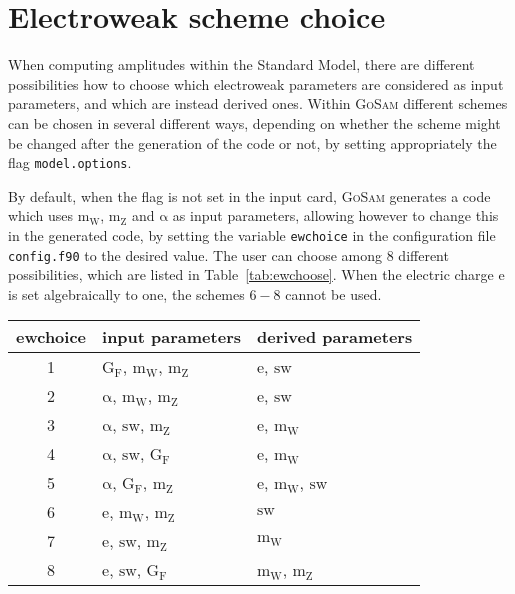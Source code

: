 \documentclass[11pt,a4paper]{refrep}
\newcommand{\gosam}{\textsc{GoSam}\xspace}
\newcommand{\mrm}[1]{\mathrm{#1}}
\begin{document}
\section{Electroweak scheme choice}
\label{sec:ewchoose}
When computing amplitudes within the Standard Model, there are different
possibilities how to choose which electroweak parameters are
considered as input parameters, and which are instead derived
ones. Within \gosam{} different schemes can be chosen in several
different ways, depending on whether the scheme might be changed after
the generation of the code or not, by setting appropriately the flag
{\tt model.options}.

By default, when the flag is not set in the input card, \gosam{}
generates a code which uses $\mrm{m_W}$, $\mrm{m_Z}$ and
$\mrm{\alpha}$ as input parameters, allowing however to change this in
the generated code, by setting the variable {\tt ewchoice} in the
configuration file {\tt config.f90} to the desired value. The user can
choose among 8 different possibilities, which are listed in
Table~\ref{tab:ewchoose}.  When the electric charge $\mrm{e}$ is set
algebraically to one, the schemes $6-8$ cannot be used.

\begin{table*}
\begin{center}
\small
\begin{tabular}{|c|l|l|}
\hline
ewchoice & input parameters                        & derived parameters                  \\
\hline
1        & $\mrm{G_F}$, $\mrm{m_W}$, $\mrm{m_Z}$    & $\mrm{e}$, $\mrm{sw}$              \\
2        & $\mrm{\alpha}$, $\mrm{m_W}$, $\mrm{m_Z}$ & $\mrm{e}$, $\mrm{sw}$              \\
3        & $\mrm{\alpha}$, $\mrm{sw}$, $\mrm{m_Z}$  & $\mrm{e}$, $\mrm{m_W}$             \\
4        & $\mrm{\alpha}$, $\mrm{sw}$, $\mrm{G_F}$  & $\mrm{e}$, $\mrm{m_W}$             \\
5        & $\mrm{\alpha}$, $\mrm{G_F}$, $\mrm{m_Z}$ & $\mrm{e}$, $\mrm{m_W}$, $\mrm{sw}$ \\
6        & $\mrm{e}$, $\mrm{m_W}$, $\mrm{m_Z}$      & $\mrm{sw}$                         \\
7        & $\mrm{e}$, $\mrm{sw}$, $\mrm{m_Z}$       & $\mrm{m_W}$                        \\
8        & $\mrm{e}$, $\mrm{sw}$, $\mrm{G_F}$       & $\mrm{m_W}$, $\mrm{m_Z}$           \\
\hline
\end{tabular}
\end{center}
\caption{Possible choices to select the electroweak scheme.
To simplify the notation we write the sine of the Weinberg angle as
$\mrm{sw}$. The lists of derived parameters contain only the
parameters which are computed and used in the expressions for the
amplitudes.}\label{tab:ewchoose}
\end{table*}
\end{document}
